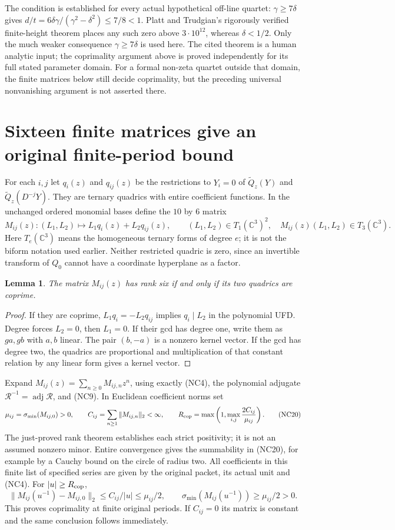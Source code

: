 \documentclass[11pt]{article}
\newtheorem{lemma}[theorem]{Lemma}
\newcommand{\C}{\mathbb C}
\begin{document}
The condition is established for every actual hypothetical off-line
quartet: $\gamma\ge7\delta$ gives
$d/t=6\delta\gamma/(\gamma^2-\delta^2)\le7/8<1$.
Platt and Trudgian's rigorously verified finite-height theorem
\cite{PT} places any such zero above $3\cdot10^{12}$, whereas
$\delta<1/2$. Only the much weaker consequence $\gamma\ge7\delta$
is used here. The cited theorem is a human analytic input; the
coprimality argument above is proved independently for its full stated
parameter domain. For a formal non-zeta quartet outside that domain,
the finite matrices below still decide coprimality, but the preceding
universal nonvanishing argument is not asserted there.

\section{Sixteen finite matrices give an original finite-period bound}
For each $i,j$ let $q_i(z)$ and $q_{ij}(z)$ be the restrictions to
$Y_i=0$ of $\widetilde Q_z(Y)$ and $\widetilde Q_z(D^{-j}Y)$.
They are ternary quadrics with entire coefficient functions. In the
unchanged ordered monomial bases define the $10$ by $6$ matrix
\[
 M_{ij}(z):(L_1,L_2)\longmapsto L_1q_i(z)+L_2q_{ij}(z),
 \qquad (L_1,L_2)\in T_1(\C^3)^2,\quad
 M_{ij}(z)(L_1,L_2)\in T_3(\C^3). \tag{NC19}
\]
Here $T_e(\C^3)$ means the homogeneous ternary forms of degree $e$;
it is not the biform notation used earlier. Neither restricted
quadric is zero, since an invertible transform of $Q_0$ cannot have
a coordinate hyperplane as a factor.

\begin{lemma}
The matrix $M_{ij}(z)$ has rank six if and only if its two quadrics
are coprime.
\end{lemma}
\begin{proof}
If they are coprime, $L_1q_i=-L_2q_{ij}$ implies $q_i\mid L_2$ in
the polynomial UFD. Degree forces $L_2=0$, then $L_1=0$.
If their gcd has degree one, write them as $g a,g b$ with $a,b$
linear. The pair $(b,-a)$ is a nonzero kernel vector. If the gcd has
degree two, the quadrics are proportional and multiplication of that
constant relation by any linear form gives a kernel vector.
\end{proof}

Expand $M_{ij}(z)=\sum_{n\ge0}M_{ij,n}z^n$, using exactly (NC4),
the polynomial adjugate $\mathcal R^{-1}=\operatorname{adj}\mathcal R$,
and (NC9). In Euclidean coefficient norms set
\[
 \mu_{ij}=\sigma_{\min}(M_{ij,0})>0,\qquad
 C_{ij}=\sum_{n\ge1}\|M_{ij,n}\|_2<\infty,
 \qquad
 R_{\rm cop}=\max\left(1,\max_{i,j}\frac{2C_{ij}}{\mu_{ij}}\right).
 \tag{NC20}
\]
The just-proved rank theorem establishes each strict positivity; it is
not an assumed nonzero minor. Entire convergence gives the summability
in (NC20), for example by a Cauchy bound on the circle of radius two.
All coefficients in this finite list of specified series are given by
the original packet, its actual unit and (NC4). For $|u|\ge R_{\rm cop}$,
\[
 \|M_{ij}(u^{-1})-M_{ij,0}\|_2\le C_{ij}/|u|
 \le\mu_{ij}/2,
 \qquad \sigma_{\min}(M_{ij}(u^{-1}))\ge\mu_{ij}/2>0.
 \tag{NC21}
\]
This proves coprimality at finite original periods. If $C_{ij}=0$ its
matrix is constant and the same conclusion follows immediately.
\end{document}
